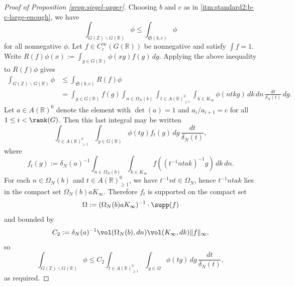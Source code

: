 \begin{proof}[Proof of Proposition \ref{prop:siegel-upper}]
  Choosing $b$ and $c$ as in \eqref{itm:standard2:b-c-large-enough}, we have
  \begin{equation*}
    \int_{G(\mathbb{Z}) \backslash G(\mathbb{R})} \phi \leq \int_{\mathfrak{S}(b,c)} \phi
  \end{equation*}
  for all nonnegative $\phi$.  Let $f \in C_c^\infty(G(\mathbb{R}))$ be nonnegative and satisfy $\int f = 1$.  Write $R(f) \phi(x) := \int_{g \in G(\mathbb{R})} \phi(x g) f(g) \, d g$.  Applying the above inequality to $R(f) \phi$ gives
  \begin{align*}
    \int_{G(\mathbb{Z}) \backslash G(\mathbb{R})} \phi
    &\leq
      \int_{\mathfrak{S}(b,c)} R(f) \phi \\
    &=
      \int_{g \in G(\mathbb{R})} f(g)
      \int_{n \in \Omega_N(b)}
      \int_{t \in A(\mathbb{R})^0_{\geq c}}
      \int_{k \in K_\infty }
      \phi(n t k g)
      \, d k
      \, d n \, \frac{d t}{\delta_N(t)} \, d g.
  \end{align*}
  Let $a \in A(\mathbb{R})^0$ denote the element with $\det(a) = 1$ and $a_i/a_{i+1} = c$ for all $1 \leq i < \rank(G)$.  Then this last integral may be written
  \begin{equation*}
    \int_{t \in A(\mathbb{R})^0_{\geq 1}}
    \int_{g \in G(\mathbb{R})}
    \phi(t g)
    f_t(g) \, d g \, \frac{d t}{\delta_N(t)},
  \end{equation*}
  where
  \begin{equation*}
    f_t(g) :=
    \delta_N(a)^{-1}
    \int_{n \in \Omega_N(b)}
    \int_{k \in K_\infty }
    f((t^{-1} n t a k )^{-1} g)
    \, d k
    \, d n.
  \end{equation*}
  For each $n \in \Omega_N(b)$ and $t \in A(\mathbb{R})^0_{\geq 1}$, we have $t^{-1} n t \in \Omega_N$, hence $t^{-1} n t a k$ lies in the compact set $\Omega_N(b) a K_\infty$.  Therefore $f_t$ is supported on the compact set
  \begin{equation*}
    \Omega := (\Omega_N(b) a K_\infty)^{-1} \cdot \supp(f)
  \end{equation*}
  and bounded by
  \begin{equation*}
    C_2 := \delta_N(a)^{-1} \vol(\Omega_N(b), d n) \vol(K_\infty, d k) \|f\|_{\infty},
  \end{equation*}
  so
  \begin{equation*}
    \int_{G(\mathbb{Z}) \backslash G(\mathbb{R})} \phi \leq
    C_2 \int_{t \in A(\mathbb{R})^0_{\geq 1}}
    \int_{g \in \Omega } \phi(t g) \, d g \, \frac{d t}{\delta_N(t)},
  \end{equation*}
  as required.
\end{proof}
